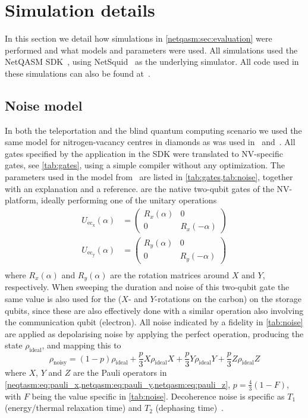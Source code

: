 \section{Simulation details}
\label{netqasm:sec:simulation}

In this section we detail how simulations in \cref{netqasm:sec:evaluation} were
performed and what models and parameters were used. All simulations used the
\ac{NetQASM} SDK~\cite{git_netqasm}, using
NetSquid~\cite{netsquid,coopmans2021netsquid} as the underlying simulator. All
code used in these simulations can also be found at~\cite{git_squidasm}.


\subsection{Noise model}
In both the teleportation and the blind quantum computing scenario we used the
same model for nitrogen-vacancy centres in diamonds as was used
in~\cite{dahlberg2019linklayer} and~\cite{coopmans2021netsquid}. All gates
specified by the application in the SDK were translated to NV-specific gates,
see \cref{tab:gates}, using a simple compiler without any optimization. The
parameters used in the model from~\cite{dahlberg2019linklayer} are listed in
\cref{tab:gates,tab:noise}, together with an explanation and a reference.
 are the native two-qubit gates of the NV-platform,
ideally performing one of the unitary operations
\begin{align}
  U_\mathrm{ec_x}(\alpha) & = \begin{pmatrix}R_x(\alpha) & 0 \\ 0 & R_x(-\alpha) \end{pmatrix} \label{eq:crot_x} \\
  U_\mathrm{ec_y}(\alpha) & = \begin{pmatrix}R_y(\alpha) & 0 \\ 0 & R_y(-\alpha) \end{pmatrix} \label{eq:crot_y} \\
\end{align}
where $R_x(\alpha)$ and $R_y(\alpha)$ are the rotation matrices around $X$ and
$Y$, respectively. When sweeping the duration and noise of this two-qubit gate
the same value is also used for the  ($X$- and $Y$-rotations
on the carbon) on the storage qubits, since these are also effectively done with
a similar operation also involving the communication qubit (electron). All noise
indicated by a fidelity in \cref{tab:noise} are applied as depolarising noise by
applying the perfect operation, producing the state $\rho_\mathrm{ideal}$, and
mapping this to
\begin{equation}\label{eq:depolarising}
  \rho_\mathrm{noisy}=(1-p)\rho_\mathrm{ideal} + \frac{p}{3}X\rho_\mathrm{ideal}X + \frac{p}{3}Y\rho_\mathrm{ideal}Y + \frac{p}{3}Z\rho_\mathrm{ideal}Z
\end{equation}
where $X$, $Y$ and $Z$ are the Pauli operators in
\cref{neqtasm:eq:pauli_x,netqasm:eq:pauli_y,netqasm:eq:pauli_z}, $p=\frac{4}{3}(1 - F)$, with $F$ being
the value specific in \cref{tab:noise}. Decoherence noise is specific as $T_1$
(energy/thermal relaxation time) and $T_2$ (dephasing time)~\cite{Nielsen2010}.

